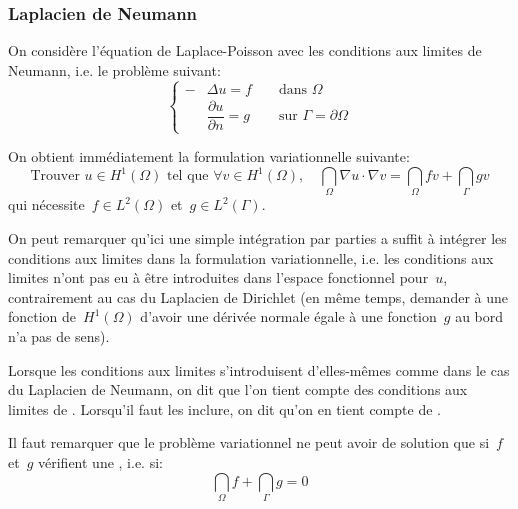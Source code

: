 \medskip
\subsubsection{Laplacien de Neumann}
On considère l'équation de Laplace-Poisson avec les conditions aux limites de Neumann,
i.e. le problème suivant:
\begin{equation}\left\{\begin{aligned}
-&\Delta u=f &&\text{ dans } \Omega\\
&\dfrac{\partial u}{\partial n}=g &&\text{ sur } \Gamma=\partial\Omega
\end{aligned}
\right.
\end{equation}

\medskip
On obtient immédiatement la formulation variationnelle suivante:
\begin{equation}
\text{Trouver } u \in H^1(\Omega) \text{ tel que }
\forall v\in H^1(\Omega),\quad \dint_\Omega \nabla u\cdot\nabla v = \dint_\Omega fv + \dint_\Gamma gv
\end{equation}
qui nécessite~$f\in L^2(\Omega)$ et~$g\in L^2(\Gamma)$.

\medskip
On peut remarquer qu'ici une simple intégration par parties a suffit à intégrer les conditions aux
limites dans la formulation variationnelle, i.e. les conditions aux limites n'ont pas eu à être introduites
dans l'espace fonctionnel pour~$u$, contrairement au cas du Laplacien de Dirichlet
(en même temps, demander à une fonction de~$H^1(\Omega)$ d'avoir une dérivée
normale égale à une fonction~$g$ au bord n'a pas de sens).

Lorsque les conditions aux limites s'introduisent d'elles-mêmes comme dans
le cas du Laplacien de Neumann, on dit que l'on tient compte des conditions aux limites de
. Lorsqu'il faut les inclure, on dit qu'on en tient
compte de .

\medskip
Il faut remarquer que le problème variationnel ne peut avoir de solution que
si~$f$ et~$g$ vérifient une , i.e. si:
\begin{equation}
\dint_\Omega f + \dint_\Gamma g = 0
\end{equation}

